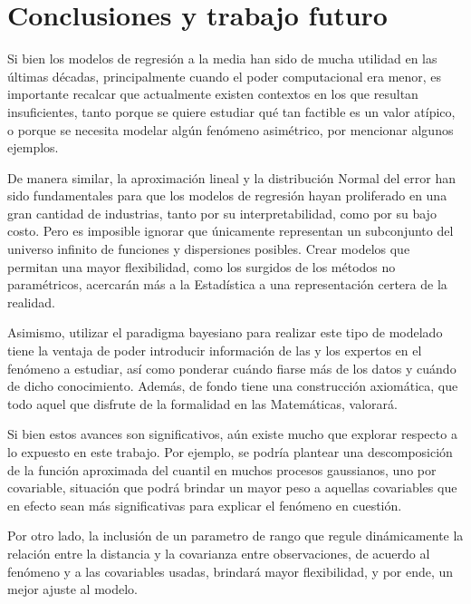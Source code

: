 \chapter[Conclusiones y trabajo futuro]{Conclusiones y trabajo futuro}

Si bien los modelos de regresi\'on a la media han sido de mucha utilidad en las \'ultimas d\'ecadas, principalmente cuando el poder computacional era menor, es importante recalcar que actualmente existen contextos en los que resultan insuficientes, tanto porque se quiere estudiar qu\'e tan factible es un valor at\'ipico, o porque se necesita modelar alg\'un fen\'omeno asim\'etrico, por mencionar algunos ejemplos.

De manera similar, la aproximaci\'on lineal y la distribuci\'on Normal del error han sido fundamentales para que los modelos de regresi\'on hayan proliferado en una gran cantidad de industrias, tanto por su interpretabilidad, como por su bajo costo. Pero es imposible ignorar que \'unicamente representan un subconjunto del universo infinito de funciones y dispersiones posibles. Crear modelos que permitan una mayor flexibilidad, como los surgidos de los m\'etodos no param\'etricos, acercar\'an m\'as a la Estad\'istica a una representaci\'on certera de la realidad.

Asimismo, utilizar el paradigma bayesiano para realizar este tipo de modelado tiene la ventaja de poder introducir informaci\'on de las y los expertos en el fen\'omeno a estudiar, as\'i como ponderar cu\'ando fiarse m\'as de los datos y cu\'ando de dicho conocimiento. Adem\'as, de fondo tiene una construcci\'on axiom\'atica, que todo aquel que disfrute de la formalidad en las Matem\'aticas, valorar\'a.

Si bien estos avances son significativos, a\'un existe mucho que explorar respecto a lo expuesto en este trabajo. Por ejemplo, se podr\'ia plantear una descomposici\'on de la funci\'on aproximada del cuantil en muchos procesos gaussianos, uno por covariable, situaci\'on que podr\'a brindar un mayor peso a aquellas covariables que en efecto sean m\'as significativas para explicar el fen\'omeno en cuesti\'on. 

Por otro lado, la inclusi\'on de un parametro de rango que regule din\'amicamente la relaci\'on entre la distancia y la covarianza entre observaciones, de acuerdo al fen\'omeno y a las covariables usadas, brindar\'a mayor flexibilidad, y por ende, un mejor ajuste al modelo.

\newpage 